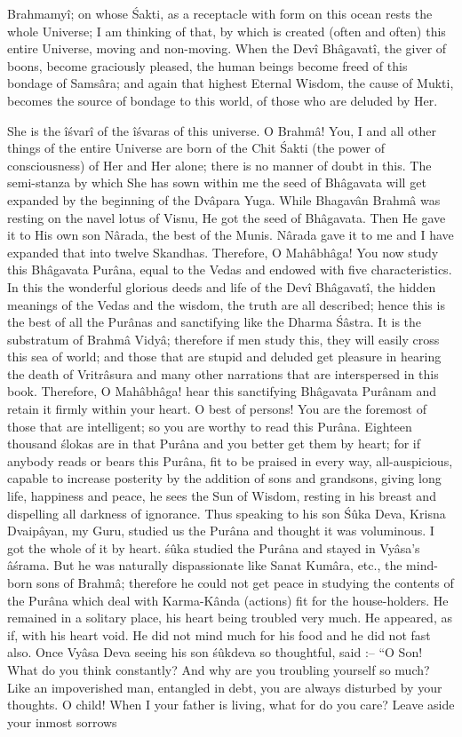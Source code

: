 Brahmamy\^i; on whose \'Sakti, as a receptacle with form on this ocean rests the whole Universe; I am thinking of that, by which is created (often and often) this entire Universe, moving and non-moving. When the Dev\^i Bh\^agavat\^i, the giver of boons, become graciously pleased, the human beings become freed of this bondage of Sams\^ara; and again that highest Eternal Wisdom, the cause of Mukti, becomes the source of bondage to this world, of those who are deluded by Her.

She is the \^i\'svar\^i of the \^i\'svaras of this universe. O Brahm\^a! You, I and all other things of the entire Universe are born of the Chit \'Sakti (the power of consciousness) of Her and Her alone; there is no manner of doubt in this. The semi-stanza by which She has sown within me the seed of Bh\^agavata will get expanded by the beginning of the Dv\^apara Yuga. While Bhagav\^an Brahm\^a was resting on the navel lotus of Visnu, He got the seed of Bh\^agavata. Then He gave it to His own son N\^arada, the best of the Munis. N\^arada gave it to me and I have expanded that into twelve Skandhas. Therefore, O Mah\^abh\^aga! You now study this Bh\^agavata Pur\^ana, equal to the Vedas and endowed with five characteristics. In this the wonderful glorious deeds and life of the Dev\^i Bh\^agavat\^i, the hidden meanings of the Vedas and the wisdom, the truth are all described; hence this is the best of all the Pur\^anas and sanctifying like the Dharma \'S\^astra. It is the substratum of Brahm\^a Vidy\^a; therefore if men study this, they will easily cross this sea of world; and those that are stupid and deluded get pleasure in hearing the death of Vritr\^asura and many other narrations that are interspersed in this book. Therefore, O Mah\^abh\^aga! hear this sanctifying Bh\^agavata Pur\^anam and retain it firmly within your heart. O best of persons! You are the foremost of those that are intelligent; so you are worthy to read this Pur\^ana. Eighteen thousand \'slokas are in that Pur\^ana and you better get them by heart; for if anybody reads or bears this Pur\^ana, fit to be praised in every way, all-auspicious, capable to increase posterity by the addition of sons and grandsons, giving long life, happiness and peace, he sees the Sun of Wisdom, resting in his breast and dispelling all darkness of ignorance. Thus speaking to his son \'S\^uka Deva, Krisna Dvaip\^ayan, my Guru, studied us the Pur\^ana and thought it was voluminous. I got the whole of it by heart. \'s\^uka studied the Pur\^ana and stayed in Vy\^asa's \^a\'srama. But he was naturally dispassionate like Sanat Kum\^ara, etc., the mind-born sons of Brahm\^a; therefore he could not get peace in studying the contents of the Pur\^ana which deal with Karma-K\^anda (actions) fit for the house-holders. He remained in a solitary place, his heart being troubled very much. He appeared, as if, with his heart void. He did not mind much for his food and he did not fast also. Once Vy\^asa Deva seeing his son \'s\^ukdeva so thoughtful, said :-- ``O Son! What do you think constantly? And why are you troubling yourself so much? Like an impoverished man, entangled in debt, you are always disturbed by your thoughts. O child! When I your father is living, what for do you care? Leave aside your inmost sorrows 